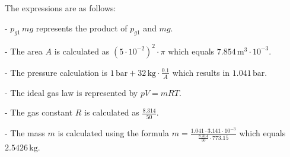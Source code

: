 The expressions are as follows:

- \( p_{g1} \, mg \) represents the product of \( p_{g1} \) and \( mg \).

- The area \( A \) is calculated as \( (5 \cdot 10^{-2})^2 \cdot \pi \) which equals \( 7.854 \, \text{m}^3 \cdot 10^{-3} \).

- The pressure calculation is \( 1 \, \text{bar} + 32 \, \text{kg} \cdot \frac{0.1}{A} \) which results in \( 1.041 \, \text{bar} \).

- The ideal gas law is represented by \( pV = mRT \).

- The gas constant \( R \) is calculated as \( \frac{8.314}{50} \).

- The mass \( m \) is calculated using the formula \( m = \frac{1.041 \cdot 3.141 \cdot 10^{-3}}{\frac{8.314}{50} \cdot 773.15} \) which equals \( 2.5426 \, \text{kg} \).